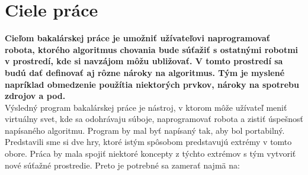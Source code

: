 \section{Ciele práce}%
{\bf Cieľom bakalárskej práce je umožniť užívateľovi naprogramovať robota, ktorého algoritmus chovania bude súťažiť s ostatnými robotmi v prostredí, kde si navzájom môžu ubližovať. V tomto prostredí sa budú dať definovať aj rôzne nároky na algoritmus. Tým je myslené napríklad obmedzenie použítia niektorých prvkov, nároky na spotrebu zdrojov a pod. }\\ %
\indent Výsledný program bakalárskej práce je nástroj, v ktorom môže užívateľ meniť virtuálny svet, kde sa odohrávaju súboje, naprogramovať robota a zistiť úspešnosť napísaného algoritmu. Program by mal byť napísaný tak, aby bol portabilný.\\ 
Predstavili sme si dve hry, ktoré istým spôsobom predstavujú extrémy v tomto obore. Práca by mala spojiť niektoré koncepty z týchto extrémov s tým vytvoriť nové súťažné prostredie. %
\newline
Preto je potrebné sa zamerať najmä na: %
